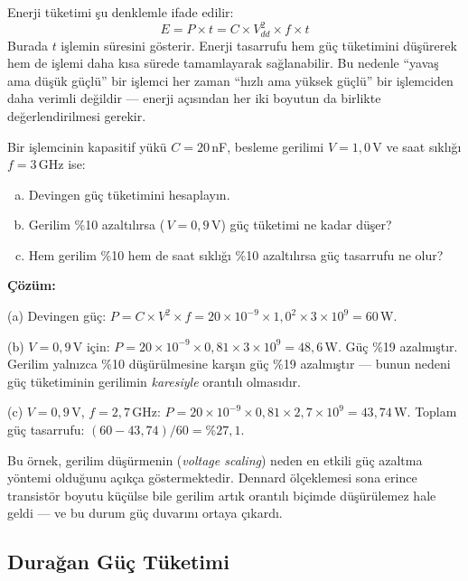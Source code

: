 Enerji tüketimi şu denklemle ifade edilir:
\begin{equation}
E = P \times t = C \times V_{dd}^2 \times f \times t
\label{eq:enerji}
\end{equation}
Burada $t$ işlemin süresini gösterir. Enerji tasarrufu hem güç tüketimini düşürerek hem de işlemi daha kısa sürede tamamlayarak sağlanabilir. Bu nedenle ``yavaş ama düşük güçlü'' bir işlemci her zaman ``hızlı ama yüksek güçlü'' bir işlemciden daha verimli değildir --- enerji açısından her iki boyutun da birlikte değerlendirilmesi gerekir.

\begin{ornek}[1.5]
\label{orn:guc-hesaplama}
Bir işlemcinin kapasitif yükü $C = 20$\,nF, besleme gerilimi $V = 1{,}0$\,V ve saat sıklığı $f = 3$\,GHz ise:
\begin{enumerate}[(a)]
\item Devingen güç tüketimini hesaplayın.
\item Gerilim \%10 azaltılırsa (\,$V = 0{,}9$\,V) güç tüketimi ne kadar düşer?
\item Hem gerilim \%10 hem de saat sıklığı \%10 azaltılırsa güç tasarrufu ne olur?
\end{enumerate}

\textbf{Çözüm:}

(a) Devingen güç: $P = C \times V^2 \times f = 20 \times 10^{-9} \times 1{,}0^2 \times 3 \times 10^{9} = 60$\,W.

(b) $V = 0{,}9$\,V için: $P = 20 \times 10^{-9} \times 0{,}81 \times 3 \times 10^{9} = 48{,}6$\,W. Güç \%19 azalmıştır. Gerilim yalnızca \%10 düşürülmesine karşın güç \%19 azalmıştır --- bunun nedeni güç tüketiminin gerilimin \emph{karesiyle} orantılı olmasıdır.

(c) $V = 0{,}9$\,V, $f = 2{,}7$\,GHz: $P = 20 \times 10^{-9} \times 0{,}81 \times 2{,}7 \times 10^{9} = 43{,}74$\,W. Toplam güç tasarrufu: $(60 - 43{,}74)/60 = \%27{,}1$.

Bu örnek, gerilim düşürmenin (\emph{voltage scaling}) neden en etkili güç azaltma yöntemi olduğunu açıkça göstermektedir. Dennard ölçeklemesi sona erince transistör boyutu küçülse bile gerilim artık orantılı biçimde düşürülemez hale geldi --- ve bu durum güç duvarını ortaya çıkardı.
\end{ornek}


\subsection{Durağan Güç Tüketimi}
\label{sec:duragan-guc}

